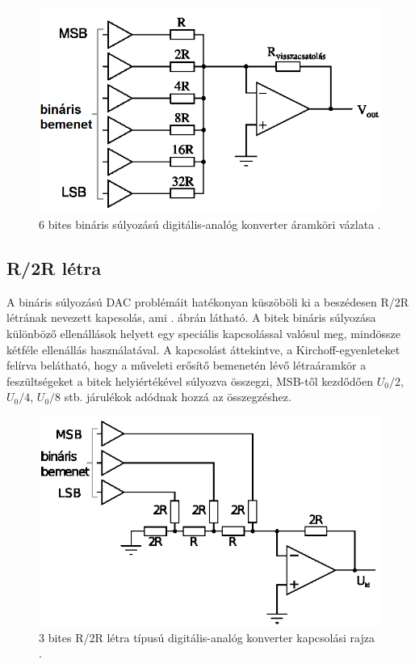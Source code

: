 \documentclass[12pt]{article}
\theoremstyle{plain}
\begin{document}
\begin{figure}
	\centering
	\includegraphics[width=0.7\linewidth]{media/DAC_binaris}
	\caption{6 bites bináris súlyozású digitális-analóg konverter áramköri vázlata \cite{Bagoly}.}
	\label{fig:dacbinaris}
\end{figure}


\subsection{R/2R létra \cite{Bagoly}}

A bináris súlyozású DAC problémáit hatékonyan küszöböli ki a beszédesen R/2R létrának nevezett kapcsolás, ami . ábrán látható.
A bitek bináris súlyozása különböző ellenállások helyett egy speciális kapcsolással valósul meg, mindössze kétféle ellenállás használatával. A kapcsolást áttekintve, a Kirchoff-egyenleteket felírva belátható, hogy a műveleti erősítő bemenetén lévő létraáramkör a feszültségeket a bitek helyiértékével súlyozva összegzi, MSB-től kezdődően $U_0/2$, $U_0/4$, $U_0/8$ stb. járulékok adódnak hozzá az összegzéshez.


\begin{figure}
	\centering
	\includegraphics[width=0.7\linewidth]{media/DAC_letra}
	\caption{3 bites R/2R létra típusú digitális-analóg konverter kapcsolási rajza \cite{Bagoly}.}
	\label{fig:dacletra}
\end{figure}
\end{document}

